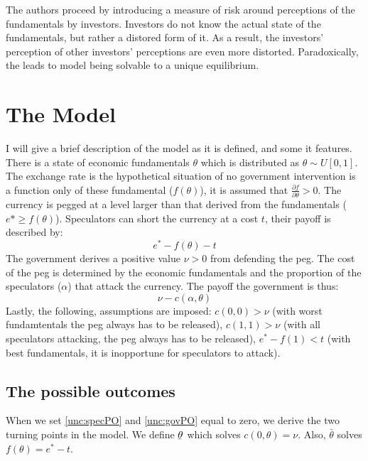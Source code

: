 \begin{refsection}
The authors proceed by introducing a measure of risk around perceptions of the fundamentals by investors.
Investors do not know the actual state of the fundamentals, but rather a distored form of it.
As a result, the investors' perception of other investors' perceptions are even more distorted.
Paradoxically, the leads to model being solvable to a unique equilibrium.

\section{The Model}
\label{unc:model}
I will give a brief description of the model as it is defined, and some it features.
There is a state of economic fundamentals $\theta$ which is distributed as $\theta \sim U[0,1]$.
The exchange rate is the hypothetical situation of no government intervention is a function only of these fundamental ($f(\theta)$),
it is assumed that $\frac{\partial f}{\partial \theta} > 0$.
The currency is pegged at a level larger than that derived from the fundamentals ($e* \geq f(\theta)$).
Speculators can short the currency at a cost $t$, their payoff is described by:
\begin{equation}\label{unc:specPO}
e^* - f(\theta) - t
\end{equation}
The government derives a positive value $\nu > 0$ from defending the peg.
The cost of the peg is determined by the economic fundamentals and the proportion of the speculators ($\alpha$) that attack the currency.
The payoff the government is thus:
\begin{equation}\label{unc:govPO}
\nu - c(\alpha, \theta)
\end{equation}
Lastly, the following, assumptions are imposed: $c(0,0) > \nu$ (with worst fundamtentals the peg always has to be released),
$c(1,1) > \nu$ (with all speculators attacking, the peg always has to be released),
$e^* - f(1) < t$ (with best fundamentals, it is inopportune for speculators to attack).

\subsection{The possible outcomes}
When we set \autoref{unc:specPO} and \autoref{unc:govPO} equal to zero,
we derive the two turning points in the model.
We define $\underaccent{\bar}{\theta}$ which solves $c(0, \theta) = \nu$.
Also, $\bar{\theta}$ solves $f(\theta) = e^* - t$.


\end{refsection}
